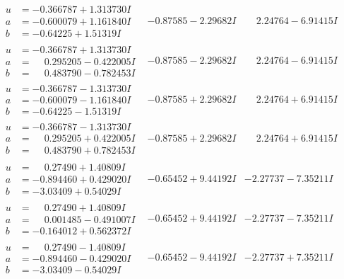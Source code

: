 \documentclass[1p]{elsarticle_modified}
\theoremstyle{definition}
\begin{document}
$$\begin{array}{c|c|c}
\begin{aligned}
u &= -0.366787 + 1.313730 I \\
a &= -0.600079 + 1.161840 I \\
b &= -0.64225 + 1.51319 I\end{aligned}
 & -0.87585 - 2.29682 I & \phantom{-}2.24764 - 6.91415 I \\ \hline\begin{aligned}
u &= -0.366787 + 1.313730 I \\
a &= \phantom{-}0.295205 - 0.422005 I \\
b &= \phantom{-}0.483790 - 0.782453 I\end{aligned}
 & -0.87585 - 2.29682 I & \phantom{-}2.24764 - 6.91415 I \\ \hline\begin{aligned}
u &= -0.366787 - 1.313730 I \\
a &= -0.600079 - 1.161840 I \\
b &= -0.64225 - 1.51319 I\end{aligned}
 & -0.87585 + 2.29682 I & \phantom{-}2.24764 + 6.91415 I \\ \hline\begin{aligned}
u &= -0.366787 - 1.313730 I \\
a &= \phantom{-}0.295205 + 0.422005 I \\
b &= \phantom{-}0.483790 + 0.782453 I\end{aligned}
 & -0.87585 + 2.29682 I & \phantom{-}2.24764 + 6.91415 I \\ \hline\begin{aligned}
u &= \phantom{-}0.27490 + 1.40809 I \\
a &= -0.894460 + 0.429020 I \\
b &= -3.03409 + 0.54029 I\end{aligned}
 & -0.65452 + 9.44192 I & -2.27737 - 7.35211 I \\ \hline\begin{aligned}
u &= \phantom{-}0.27490 + 1.40809 I \\
a &= \phantom{-}0.001485 - 0.491007 I \\
b &= -0.164012 + 0.562372 I\end{aligned}
 & -0.65452 + 9.44192 I & -2.27737 - 7.35211 I \\ \hline\begin{aligned}
u &= \phantom{-}0.27490 - 1.40809 I \\
a &= -0.894460 - 0.429020 I \\
b &= -3.03409 - 0.54029 I\end{aligned}
 & -0.65452 - 9.44192 I & -2.27737 + 7.35211 I \\ \hline\begin{aligned}

\end{aligned}
\end{array}$$
\end{document}
